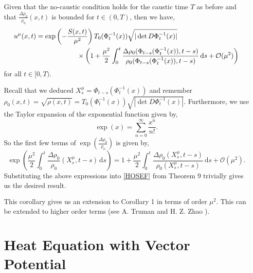 \documentclass[a4paper,12pt,draft]{report}
\begin{document}
\corollary
{
Given that the no-caustic condition holds for the caustic time $T$ as before and that $\frac{\Delta \rho_0}{\rho_0}(x, t)$ is bounded for $t \in (0, T)$, then we have,
\begin{align}
u^\mu(x, t) = \exp & \left(-\frac{S(x, t)}{\mu^2}\right)T_0(\Phi_t^{-1}(x))\sqrt{|\det D\Phi_t^{-1}(x)|}\nonumber\\
& \hspace{1.1cm} \times\left(1 + \frac{\mu^2}{2}\int_0^t\frac{\Delta \rho_0(\Phi_{t - s}(\Phi_t^{-1}(x)), t - s)}{\rho_0(\Phi_{t - s}(\Phi_t^{-1}(x)), t - s)}\,\mathrm{d}s + \mathcal{O}(\mu^2)\right)\nonumber
\end{align}
for all $t \in [0, T)$.
}
\proof
{
Recall that we deduced $X_s^\mu = \Phi_{t - s}(\Phi_t^{-1}(x))$ and remember $\rho_0(x, t) = \sqrt{\rho(x, t)} = T_0(\Phi_t^{-1}(x))\sqrt{|\det D\Phi_t^{-1}(x)|}$.  Furthermore, we use the Taylor expansion of the exponential function given by,
$$
\exp(x) = \sum_{n = 0}^\infty \frac{x^n}{n!}.
$$
So the first few terms of $\exp\left(\frac{\Delta\rho_0}{\rho_0}\right)$ is given by,
$$
\exp\left(\frac{\mu^2}{2}\int_0^t\frac{\Delta\rho_0}{\rho_0}(X_s^\mu, t - s)\,\mathrm{d}s\right) = 1 + \frac{\mu^2}{2}\int_0^t\frac{\Delta \rho_0(X_s^\mu, t - s)}{\rho_0(X_s^\mu, t - s)}\,\mathrm{d}s + \mathcal{O}(\mu^2).
$$
Substituting the above expressions into \eqref{HOSEF} from Theorem 9 trivially gives us the desired result.

\qedhere
}

This corollary gives us an extension to Corollary 1 in terms of order $\mu^2$.  This can be extended to higher order terms (see A. Truman and H. Z. Zhao \cite{ATHZZ}).








\chapter{Heat Equation with Vector Potential}
\end{document}
